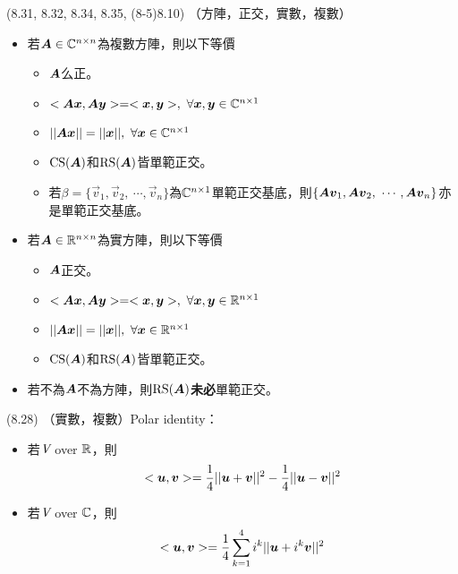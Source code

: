 \item \begin{theorem}{(8.31, 8.32, 8.34, 8.35, (8-5)8.10)} （方陣，正交，實數，複數）
	\begin{itemize}
		\item 若$\boldsymbol{A} \in \mathbb{C}^{n \times n}$為複數方陣，則以下等價
		\begin{itemize}
			\item $\boldsymbol{A}$么正。
			\item $<\boldsymbol{A}\boldsymbol{x}, \boldsymbol{A}\boldsymbol{y}> = <\boldsymbol{x}, \boldsymbol{y}>, \ \forall \boldsymbol{x}, \boldsymbol{y} \in \mathbb{C}^{n \times 1}$
			\item $||\mat{A}\vec{x}|| = ||\vec{x}||, \ \forall \vec{x} \in \C^{n \times 1}$
			\item $\operatorname{CS}(\boldsymbol{A})$和$\operatorname{RS}(\boldsymbol{A})$皆單範正交。
			\item 若$\beta = \{\vec{v}_1, \vec{v}_2, \ \cdots, \vec{v}_n\}$為$\mathbb{C}^{n \times 1}$單範正交基底，則$\{\boldsymbol{A}\boldsymbol{v}_1, \boldsymbol{A}\boldsymbol{v}_2, \ \cdots, \boldsymbol{A}\boldsymbol{v}_n\}$亦是單範正交基底。			\end{itemize}
		\item 若$\boldsymbol{A} \in \mathbb{R}^{n \times n}$為實方陣，則以下等價
		\begin{itemize}
			\item $\boldsymbol{A}$正交。
			\item $<\boldsymbol{A}\boldsymbol{x}, \boldsymbol{A}\boldsymbol{y}> = <\boldsymbol{x}, \boldsymbol{y}>, \ \forall \boldsymbol{x}, \boldsymbol{y} \in \mathbb{R}^{n \times 1}$
			\item $||\mat{A}\vec{x}|| = ||\vec{x}||, \ \forall \vec{x} \in \R^{n \times 1}$
			\item $\operatorname{CS}(\boldsymbol{A})$和$\operatorname{RS}(\boldsymbol{A})$皆單範正交。
		\end{itemize}
		\item 若不為$\boldsymbol{A}$不為方陣，則$\operatorname{RS}(\boldsymbol{A})$\textbf{未必}單範正交。
	\end{itemize}
\end{theorem}

\item \begin{theorem}{(8.28)} （實數，複數）Polar identity：
	\begin{itemize}
		\item 若$\textit{V}$ over $\mathbb{R}$，則\begin{equation}
			<\boldsymbol{u}, \boldsymbol{v}> = \frac{1}{4}||\boldsymbol{u} + \boldsymbol{v}||^2 - \frac{1}{4}||\boldsymbol{u} - \boldsymbol{v}||^2
		\end{equation}
		\item 若$\textit{V}$ over $\mathbb{C}$，則\begin{equation}
			<\boldsymbol{u}, \boldsymbol{v}> = \frac{1}{4}\sum_{k = 1}^{4}i^k||\boldsymbol{u} + i^k\boldsymbol{v}||^2
		\end{equation}
	\end{itemize}
\end{theorem}

